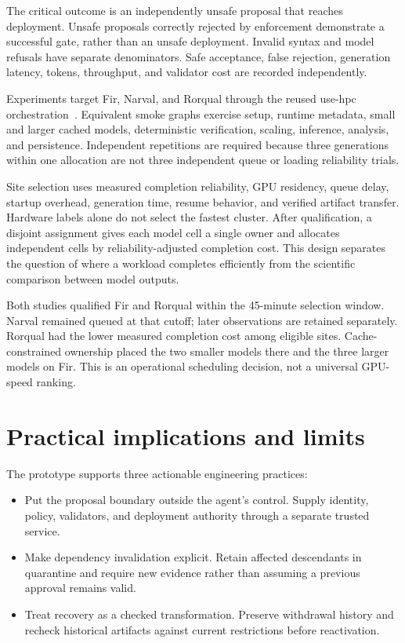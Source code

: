 \IfFileExists{IEEEcsmag.cls}{\publishertrue\documentclass{IEEEcsmag}}{\publisherfalse\documentclass[11pt]{article}}
\begin{document}
The critical outcome is an independently unsafe proposal that reaches deployment. Unsafe proposals correctly rejected by enforcement demonstrate a successful gate, rather than an unsafe deployment. Invalid syntax and model refusals have separate denominators. Safe acceptance, false rejection, generation latency, tokens, throughput, and validator cost are recorded independently.

Experiments target Fir, Narval, and Rorqual through the reused use-hpc orchestration~\cite{usehpc}. Equivalent smoke graphs exercise setup, runtime metadata, small and larger cached models, deterministic verification, scaling, inference, analysis, and persistence. Independent repetitions are required because three generations within one allocation are not three independent queue or loading reliability trials.

Site selection uses measured completion reliability, GPU residency, queue delay, startup overhead, generation time, resume behavior, and verified artifact transfer. Hardware labels alone do not select the fastest cluster. After qualification, a disjoint assignment gives each model cell a single owner and allocates independent cells by reliability-adjusted completion cost. This design separates the question of where a workload completes efficiently from the scientific comparison between model outputs.

Both studies qualified Fir and Rorqual within the 45-minute selection window. Narval remained queued at that cutoff; later observations are retained separately. Rorqual had the lower measured completion cost among eligible sites. Cache-constrained ownership placed the two smaller models there and the three larger models on Fir. This is an operational scheduling decision, not a universal GPU-speed ranking.


\section{Practical implications and limits}
The prototype supports three actionable engineering practices:
\begin{itemize}
\item Put the proposal boundary outside the agent's control. Supply identity, policy, validators, and deployment authority through a separate trusted service.
\item Make dependency invalidation explicit. Retain affected descendants in quarantine and require new evidence rather than assuming a previous approval remains valid.
\item Treat recovery as a checked transformation. Preserve withdrawal history and recheck historical artifacts against current restrictions before reactivation.
\end{itemize}
\end{document}
